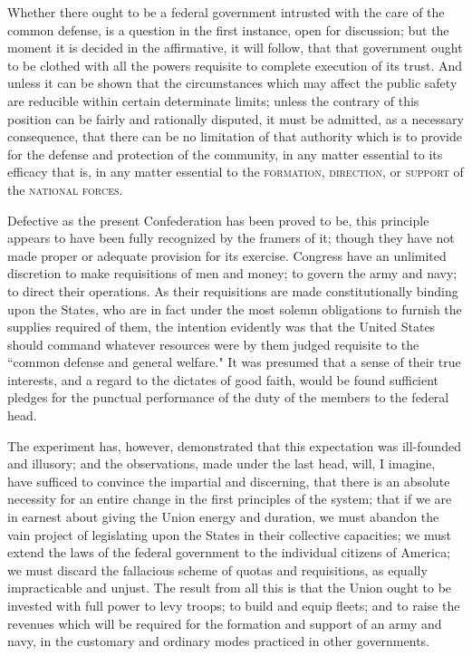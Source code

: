 Whether there ought to be a federal government intrusted with the care of the common defense, is a question in the first instance, open for discussion; but the moment it is decided in the affirmative, it will follow, that that government ought to be clothed with all the powers requisite to complete execution of its trust. And unless it can be shown that the circumstances which may affect the public safety are reducible within certain determinate limits; unless the contrary of this position can be fairly and rationally disputed, it must be admitted, as a necessary consequence, that there can be no limitation of that authority which is to provide for the defense and protection of the community, in any matter essential to its efficacy that is, in any matter essential to the \textsc{formation}, \textsc{direction}, or \textsc{support} of the \textsc{national forces}.

Defective as the present Confederation has been proved to be, this principle appears to have been fully recognized by the framers of it; though they have not made proper or adequate provision for its exercise. Congress have an unlimited discretion to make requisitions of men and money; to govern the army and navy; to direct their operations. As their requisitions are made constitutionally binding upon the States, who are in fact under the most solemn obligations to furnish the supplies required of them, the intention evidently was that the United States should command whatever resources were by them judged requisite to the ``common defense and general welfare." It was presumed that a sense of their true interests, and a regard to the dictates of good faith, would be found sufficient pledges for the punctual performance of the duty of the members to the federal head.

The experiment has, however, demonstrated that this expectation was ill-founded and illusory; and the observations, made under the last head, will, I imagine, have sufficed to convince the impartial and discerning, that there is an absolute necessity for an entire change in the first principles of the system; that if we are in earnest about giving the Union energy and duration, we must abandon the vain project of legislating upon the States in their collective capacities; we must extend the laws of the federal government to the individual citizens of America; we must discard the fallacious scheme of quotas and requisitions, as equally impracticable and unjust. The result from all this is that the Union ought to be invested with full power to levy troops; to build and equip fleets; and to raise the revenues which will be required for the formation and support of an army and navy, in the customary and ordinary modes practiced in other governments.

